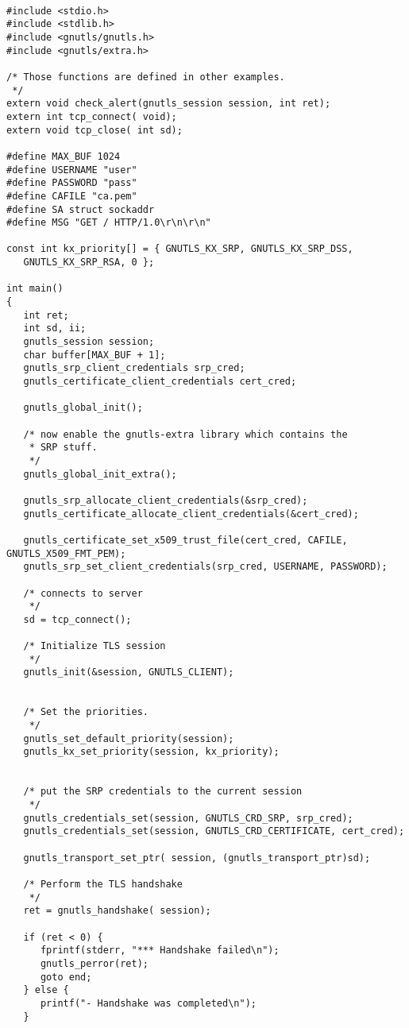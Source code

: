 \begin{verbatim}

#include <stdio.h>
#include <stdlib.h>
#include <gnutls/gnutls.h>
#include <gnutls/extra.h>

/* Those functions are defined in other examples.
 */
extern void check_alert(gnutls_session session, int ret);
extern int tcp_connect( void);
extern void tcp_close( int sd);

#define MAX_BUF 1024
#define USERNAME "user"
#define PASSWORD "pass"
#define CAFILE "ca.pem"
#define SA struct sockaddr
#define MSG "GET / HTTP/1.0\r\n\r\n"

const int kx_priority[] = { GNUTLS_KX_SRP, GNUTLS_KX_SRP_DSS, 
   GNUTLS_KX_SRP_RSA, 0 };

int main()
{
   int ret;
   int sd, ii;
   gnutls_session session;
   char buffer[MAX_BUF + 1];
   gnutls_srp_client_credentials srp_cred;
   gnutls_certificate_client_credentials cert_cred;

   gnutls_global_init();

   /* now enable the gnutls-extra library which contains the
    * SRP stuff. 
    */
   gnutls_global_init_extra();

   gnutls_srp_allocate_client_credentials(&srp_cred);
   gnutls_certificate_allocate_client_credentials(&cert_cred);

   gnutls_certificate_set_x509_trust_file(cert_cred, CAFILE, GNUTLS_X509_FMT_PEM);
   gnutls_srp_set_client_credentials(srp_cred, USERNAME, PASSWORD);

   /* connects to server 
    */
   sd = tcp_connect();

   /* Initialize TLS session 
    */
   gnutls_init(&session, GNUTLS_CLIENT);


   /* Set the priorities.
    */
   gnutls_set_default_priority(session);
   gnutls_kx_set_priority(session, kx_priority);
 

   /* put the SRP credentials to the current session
    */
   gnutls_credentials_set(session, GNUTLS_CRD_SRP, srp_cred);
   gnutls_credentials_set(session, GNUTLS_CRD_CERTIFICATE, cert_cred);

   gnutls_transport_set_ptr( session, (gnutls_transport_ptr)sd);

   /* Perform the TLS handshake
    */
   ret = gnutls_handshake( session);

   if (ret < 0) {
      fprintf(stderr, "*** Handshake failed\n");
      gnutls_perror(ret);
      goto end;
   } else {
      printf("- Handshake was completed\n");
   }


\end{verbatim}
